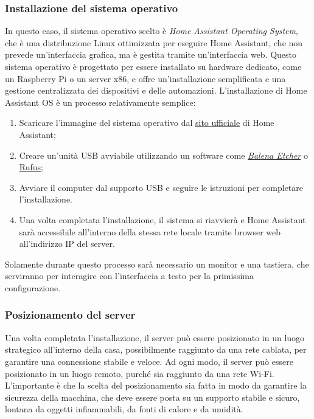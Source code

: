 \documentclass[11pt, a4paper]{article}
\begin{document}
\subsubsection{Installazione del sistema operativo}
In questo caso, il sistema operativo scelto è \textit{Home Assistant Operating System}, che è una distribuzione Linux
ottimizzata per eseguire Home Assistant, che non prevede un'interfaccia grafica, ma è gestita tramite un'interfaccia web.
Questo sistema operativo è progettato per essere installato su hardware dedicato, come un Raspberry Pi o un server x86, 
e offre un'installazione semplificata e una gestione centralizzata dei dispositivi e delle automazioni.
L'installazione di Home Assistant OS è un processo relativamente semplice:
\begin{enumerate}
    \item Scaricare l'immagine del sistema operativo dal \href{https://www.home-assistant.io/installation/}{sito ufficiale} 
    di Home Assistant;
    \item Creare un'unità USB avviabile utilizzando un software come \href{https://etcher.balena.io}{\textit{Balena Etcher}} o 
        \href{https://rufus.ie/it/}{Rufus};
    \item Avviare il computer dal supporto USB e seguire le istruzioni per completare l'installazione.
    \item Una volta completata l'installazione, il sistema si riavvierà e Home Assistant sarà accessibile 
            all'interno della stessa rete locale tramite browser web all'indirizzo IP del server.
\end{enumerate}
Solamente durante questo processo sarà necessario un monitor e una tastiera, che serviranno per interagire con l'interfaccia
a testo per la primissima configurazione.

\subsubsection{Posizionamento del server}
Una volta completata l'installazione, il server può essere posizionato in un luogo strategico all'interno della casa,
possibilmente raggiunto da una rete cablata, per garantire una connessione stabile e veloce.
Ad ogni modo, il server può essere posizionato in un luogo remoto, purché sia raggiunto da una rete Wi-Fi.
L'importante è che la scelta del posizionamento sia fatta in modo da garantire la sicurezza della macchina, che deve
essere posta su un supporto stabile e sicuro, lontana da oggetti infiammabili, da fonti di calore e da umidità.
\end{document}
